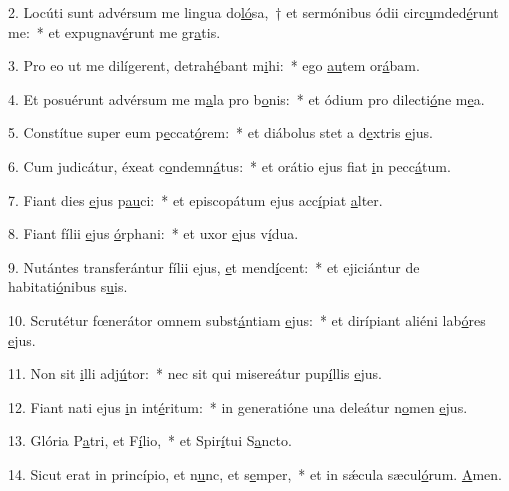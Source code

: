 2. Locúti sunt advérsum me lingua do\uline{ló}sa,~† et sermónibus ódii circ\uline{u}mded\uline{é}runt me:~* et expugnav\uline{é}runt me gr\uline{a}tis.\par 
3. Pro eo ut me dilígerent, detrah\uline{é}bant m\uline{i}hi:~* ego \uline{au}tem or\uline{á}bam.\par 
4. Et posuérunt advérsum me m\uline{a}la pro b\uline{o}nis:~* et ódium pro dilecti\uline{ó}ne m\uline{e}a.\par 
5. Constítue super eum p\uline{e}ccat\uline{ó}rem:~* et diábolus stet a d\uline{e}xtris \uline{e}jus.\par 
6. Cum judicátur, éxeat c\uline{o}ndemn\uline{á}tus:~* et orátio ejus fiat \uline{i}n pecc\uline{á}tum.\par 
7. Fiant dies \uline{e}jus p\uline{au}ci:~* et episcopátum ejus acc\uline{í}piat \uline{a}lter.\par 
8. Fiant fílii \uline{e}jus \uline{ó}rphani:~* et uxor \uline{e}jus v\uline{í}dua.\par 
9. Nutántes transferántur fílii ejus, \uline{e}t mend\uline{í}cent:~* et ejiciántur de habitati\uline{ó}nibus s\uline{u}is.\par 
10. Scrutétur fœnerátor omnem subst\uline{á}ntiam \uline{e}jus:~* et dirípiant aliéni lab\uline{ó}res \uline{e}jus.\par 
11. Non sit \uline{i}lli adj\uline{ú}tor:~* nec sit qui misereátur pup\uline{í}llis \uline{e}jus.\par 
12. Fiant nati ejus \uline{i}n int\uline{é}ritum:~* in generatióne una deleátur n\uline{o}men \uline{e}jus.\par 
13. Glória P\uline{a}tri, et F\uline{í}lio,~* et Spir\uline{í}tui S\uline{a}ncto.\par 
14. Sicut erat in princípio, et n\uline{u}nc, et s\uline{e}mper,~* et in sǽcula sæcul\uline{ó}rum. \uline{A}men.\par 
